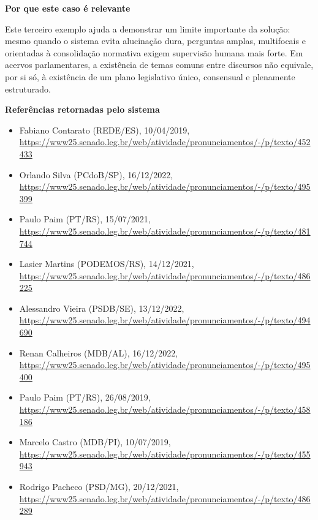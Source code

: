 \textbf{Por que este caso é relevante}

Este terceiro exemplo ajuda a demonstrar um limite importante da solução: mesmo quando o sistema evita alucinação dura, perguntas amplas, multifocais e orientadas à consolidação normativa exigem supervisão humana mais forte. Em acervos parlamentares, a existência de temas comuns entre discursos não equivale, por si só, à existência de um plano legislativo único, consensual e plenamente estruturado.

\textbf{Referências retornadas pelo sistema}

\begin{itemize}
  \item Fabiano Contarato (REDE/ES), 10/04/2019, \url{https://www25.senado.leg.br/web/atividade/pronunciamentos/-/p/texto/452433}
  \item Orlando Silva (PCdoB/SP), 16/12/2022, \url{https://www25.senado.leg.br/web/atividade/pronunciamentos/-/p/texto/495399}
  \item Paulo Paim (PT/RS), 15/07/2021, \url{https://www25.senado.leg.br/web/atividade/pronunciamentos/-/p/texto/481744}
  \item Lasier Martins (PODEMOS/RS), 14/12/2021, \url{https://www25.senado.leg.br/web/atividade/pronunciamentos/-/p/texto/486225}
  \item Alessandro Vieira (PSDB/SE), 13/12/2022, \url{https://www25.senado.leg.br/web/atividade/pronunciamentos/-/p/texto/494690}
  \item Renan Calheiros (MDB/AL), 16/12/2022, \url{https://www25.senado.leg.br/web/atividade/pronunciamentos/-/p/texto/495400}
  \item Paulo Paim (PT/RS), 26/08/2019, \url{https://www25.senado.leg.br/web/atividade/pronunciamentos/-/p/texto/458186}
  \item Marcelo Castro (MDB/PI), 10/07/2019, \url{https://www25.senado.leg.br/web/atividade/pronunciamentos/-/p/texto/455943}
  \item Rodrigo Pacheco (PSD/MG), 20/12/2021, \url{https://www25.senado.leg.br/web/atividade/pronunciamentos/-/p/texto/486289}
\end{itemize}
